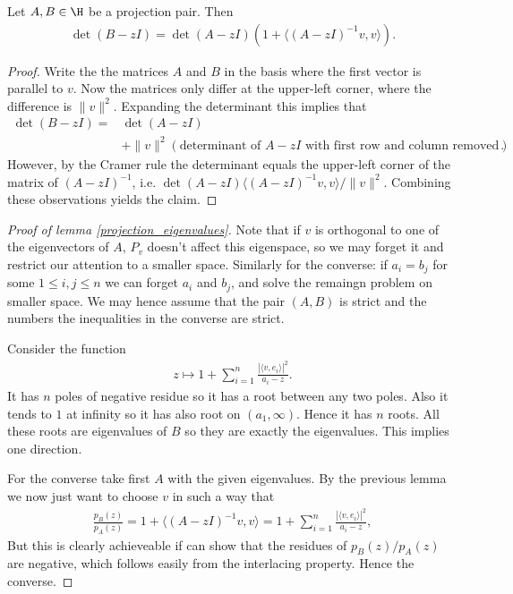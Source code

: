 \begin{lem}\label{projection_characteristic_polynomial}
	Let $A, B \in \H$ be a projection pair. Then
	\begin{align*}
		\det(B - z I) = \det(A - z I) \left(1 + \langle (A - z I)^{-1}v, v\rangle\right).
	\end{align*}
\end{lem}
\begin{proof}
	Write the the matrices $A$ and $B$ in the basis where the first vector is parallel to $v$. Now the matrices only differ at the upper-left corner, where the difference is $\|v\|^2$. Expanding the determinant this implies that
	\begin{align*}
		\det(B - z I) =& \det(A - z I) \\
		&+ \|v\|^2 \left(\text{determinant of $A - zI$ with first row and column removed} \right).
	\end{align*}
	However, by the Cramer rule the determinant equals the upper-left corner of the matrix of $(A - z I)^{-1}$, i.e. $\det(A - z I) \langle (A - zI)^{-1} v, v \rangle/\|v\|^2$. Combining these observations yields the claim.
\end{proof}

\begin{proof}[Proof of lemma \ref{projection_eigenvalues}]
	Note that if $v$ is orthogonal to one of the eigenvectors of $A$, $P_{v}$ doesn't affect this eigenspace, so we may forget it and restrict our attention to a smaller space. Similarly for the converse: if $a_{i} = b_{j}$ for some $1 \leq i, j \leq n$ we can forget $a_{i}$ and $b_{j}$, and solve the remaingn problem on smaller space. We may hence assume that the pair $(A, B)$ is strict and the numbers the inequalities in the converse are strict.

	Consider the function
	\begin{align*}
		z \mapsto 1 + \sum_{i = 1}^{n} \frac{|\langle v, e_{i} \rangle|^2}{a_{i} - z}.
	\end{align*}
	It has $n$ poles of negative residue so it has a root between any two poles. Also it tends to $1$ at infinity so it has also root on $(a_{1}, \infty)$. Hence it has $n$ roots. All these roots are eigenvalues of $B$ so they are exactly the eigenvalues. This implies one direction.

	For the converse take first $A$ with the given eigenvalues. By the previous lemma we now just want to choose $v$ in such a way that
	\begin{align*}
		\frac{p_{B}(z)}{p_{A}(z)} = 1 + \langle (A - z I)^{-1}v, v\rangle= 1 + \sum_{i = 1}^{n} \frac{|\langle v, e_{i} \rangle|^2}{a_{i} - z},
	\end{align*}
	But this is clearly achieveable if can show that the residues of $p_{B}(z)/p_{A}(z)$ are negative, which follows easily from the interlacing property. Hence the converse.
\end{proof}

